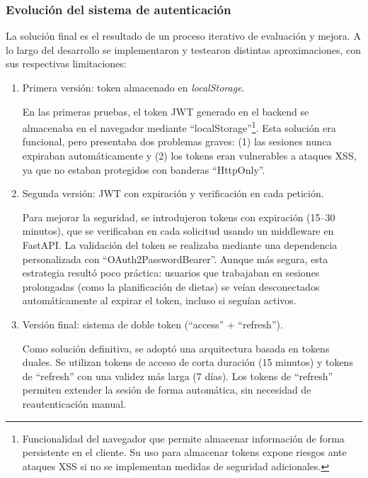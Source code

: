 \subsubsection{Evolución del sistema de autenticación}

La solución final es el resultado de un proceso iterativo de evaluación y mejora. A lo largo del desarrollo se implementaron y testearon distintas aproximaciones, con sus respectivas limitaciones:

\begin{enumerate}
    \item Primera versión: token almacenado en \textit{localStorage}.
    
    En las primeras pruebas, el token JWT generado en el backend se almacenaba en el navegador mediante ``localStorage''\footnote{Funcionalidad del navegador que permite almacenar información de forma persistente en el cliente. Su uso para almacenar tokens expone riesgos ante ataques XSS si no se implementan medidas de seguridad adicionales.}.  
    Esta solución era funcional, pero presentaba dos problemas graves: (1) las sesiones nunca expiraban automáticamente y (2) los tokens eran vulnerables a ataques XSS, ya que no estaban protegidos con banderas ``HttpOnly''.

    \item Segunda versión: JWT con expiración y verificación en cada petición.
    
    Para mejorar la seguridad, se introdujeron tokens con expiración (15–30 minutos), que se verificaban en cada solicitud usando un middleware en FastAPI. La validación del token se realizaba mediante una dependencia personalizada con ``OAuth2PasswordBearer''.  
    Aunque más segura, esta estrategia resultó poco práctica: usuarios que trabajaban en sesiones prolongadas (como la planificación de dietas) se veían desconectados automáticamente al expirar el token, incluso si seguían activos.

    \item Versión final: sistema de doble token (``access'' + ``refresh'').
    
    Como solución definitiva, se adoptó una arquitectura basada en tokens duales. Se utilizan tokens de acceso de corta duración (15 minutos) y tokens de ``refresh'' con una validez más larga (7 días). Los tokens de ``refresh'' permiten extender la sesión de forma automática, sin necesidad de reautenticación manual.


\end{enumerate}
